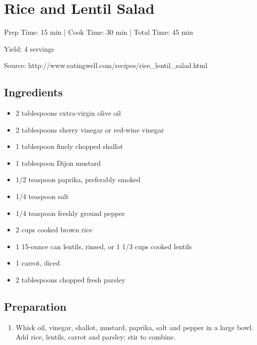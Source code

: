 \section{Rice and Lentil Salad}

\begin{center}
Prep Time: 15 min |
Cook Time: 30 min |
Total Time: 45 min

\noindent Yield: 4 servings

\vspace{1em}

Source: http://www.eatingwell.com/recipes/rice\_lentil\_salad.html
\end{center}

\subsection{Ingredients}
\begin{multicols}{2}
\begin{itemize}
    \item 2 tablespoons extra-virgin olive oil
    \item 2 tablespoons sherry vinegar or red-wine vinegar
    \item 1 tablespoon finely chopped shallot
    \item 1 tablespoon Dijon mustard
    \item 1/2 teaspoon paprika, preferably smoked
    \item 1/4 teaspoon salt
    \item 1/4 teaspoon freshly ground pepper
    \item 2 cups cooked brown rice
    \item 1 15-ounce can lentils, rinsed, or 1 1/3 cups cooked lentils
    \item 1 carrot, diced
    \item 2 tablespoons chopped fresh parsley
\end{itemize}
\end{multicols}

\subsection{Preparation}
\begin{enumerate}
    \item Whisk oil, vinegar, shallot, mustard, paprika, salt and pepper in a large bowl. Add rice, lentils, carrot and parsley; stir to combine.
\end{enumerate}

